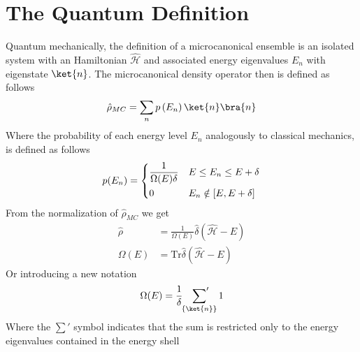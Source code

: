 \documentclass[a4paper, 11pt]{book}
\renewcommand{\trace}{\mathrm{Tr}}
\newcommand{\1}{\opr{\mathds{1}}}
\newcommand{\ham}{\mathcal{H}}
\newcommand{\opr}[1]{\hat{#1}}
\newcommand{\dopr}{\hat{\rho}}
\newcommand{\qsum}{\sideset{}{'}\sum}
\theoremstyle{plain}
\begin{document}
		\section{The Quantum Definition}
		Quantum mechanically, the definition of a microcanonical ensemble is an isolated system with an Hamiltonian $\opr{\ham}$ and associated energy eigenvalues $E_n$ with eigenstate $\ket{n}$. The microcanonical density operator then is defined as follows
		\begin{equation}
			\opr{\rho}_{MC}=\sum_np\left( E_n \right)\ket{n}\bra{n}
			\label{eq:mcdopr}
		\end{equation}
		Where the probability of each energy level $E_n$ analogously to classical mechanics, is defined as follows
		\begin{equation}
			p(E_n)=\begin{dcases}
				\frac{1}{\Omega(E)\delta}&E\le E_n\le E+\delta\\
				0&E_n\notin[E,E+\delta]
			\end{dcases}
			\label{eq:probabilitystatedoprmc}
		\end{equation}
		From the normalization of $\dopr_{MC}$ we get
		\begin{equation}
			\begin{aligned}
				\dopr&=\frac{1}{\Omega(E)}\opr{\delta}\left( \opr{\ham}-E \right)\\
				\Omega(E)&=\trace{\opr{\delta}}\left( \opr{\ham}-E \right)
			\end{aligned}
			\label{eq:OmegaEquantummc}
		\end{equation}
		Or introducing a new notation
		\begin{equation}
			\Omega(E)=\frac{1}{\delta}\qsum_{\{\ket{n}\}}1
			\label{eq:sumone}
		\end{equation}
		Where the $\sum'$ symbol indicates that the sum is restricted only to the energy eigenvalues contained in the energy shell
\end{document}
